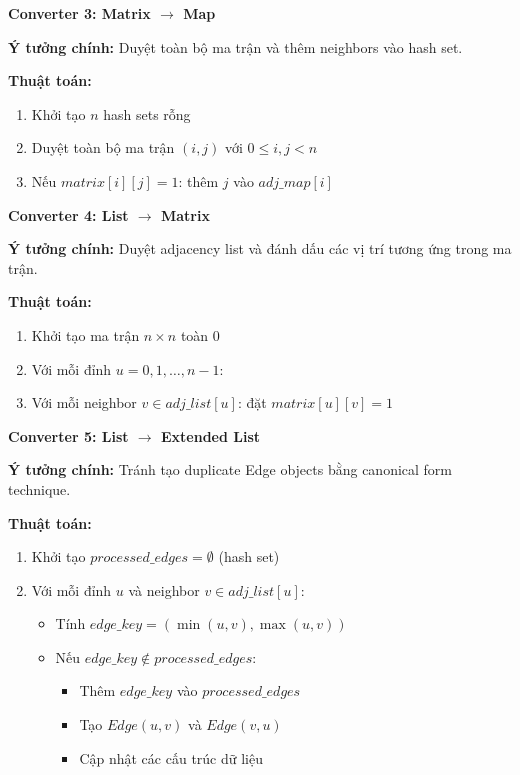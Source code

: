 \documentclass[12pt,a4paper]{article}
\begin{document}
\textbf{Converter 3: Matrix $\rightarrow$ Map}

\textbf{Ý tưởng chính:} Duyệt toàn bộ ma trận và thêm neighbors vào hash set.

\textbf{Thuật toán:}
\begin{enumerate}
    \item Khởi tạo $n$ hash sets rỗng
    \item Duyệt toàn bộ ma trận $(i,j)$ với $0 \leq i,j < n$
    \item Nếu $matrix[i][j] = 1$: thêm $j$ vào $adj\_map[i]$
\end{enumerate}
\vspace{0.5cm}

\textbf{Converter 4: List $\rightarrow$ Matrix}

\textbf{Ý tưởng chính:} Duyệt adjacency list và đánh dấu các vị trí tương ứng trong ma trận.

\textbf{Thuật toán:}
\begin{enumerate}
    \item Khởi tạo ma trận $n \times n$ toàn $0$
    \item Với mỗi đỉnh $u = 0, 1, \ldots, n-1$:
    \item Với mỗi neighbor $v \in adj\_list[u]$: đặt $matrix[u][v] = 1$
\end{enumerate}
\vspace{0.5cm}

\textbf{Converter 5: List $\rightarrow$ Extended List}

\textbf{Ý tưởng chính:} Tránh tạo duplicate Edge objects bằng canonical form technique.

\textbf{Thuật toán:}
\begin{enumerate}
    \item Khởi tạo $processed\_edges = \emptyset$ (hash set)
    \item Với mỗi đỉnh $u$ và neighbor $v \in adj\_list[u]$:
    \begin{itemize}
        \item Tính $edge\_key = (\min(u,v), \max(u,v))$
        \item Nếu $edge\_key \notin processed\_edges$:
        \begin{itemize}
            \item Thêm $edge\_key$ vào $processed\_edges$
            \item Tạo $Edge(u,v)$ và $Edge(v,u)$
            \item Cập nhật các cấu trúc dữ liệu
        \end{itemize}
    \end{itemize}
\end{enumerate}
\vspace{0.5cm}
\end{document}
